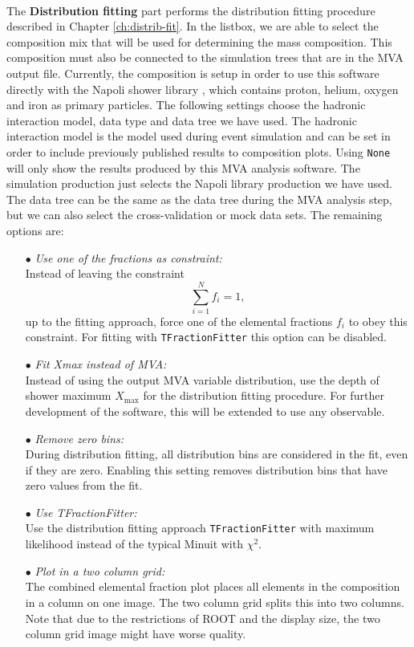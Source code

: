 \documentclass[12pt,a4paper]{report}
\begin{document}
\\
The \textbf{Distribution fitting} part performs the distribution fitting procedure described in Chapter \ref{ch:distrib-fit}. In the listbox, we are able to select the composition mix that will be used for determining the mass composition. This composition must also be connected to the simulation trees that are in the MVA output file. Currently, the composition is setup in order to use this software directly with the Napoli shower library \cite{napoli}, which contains proton, helium, oxygen and iron as primary particles. The following settings choose the hadronic interaction model, data type and data tree we have used. The hadronic interaction model is the model used during event simulation and can be set in order to include previously published results \cite{xmaxICRC2017,xmaxDistFitPRD2014,deltaMethod} to composition plots. Using \texttt{None} will only show the results produced by this MVA analysis software. The simulation production just selects the Napoli library production we have used. The data tree can be the same as the data tree during the MVA analysis step, but we can also select the cross-validation or mock data sets. The remaining options are:
\begin{itemize}
\item[$\bullet$] \emph{Use one of the fractions as constraint:}\\Instead of leaving the constraint
$$
\displaystyle\sum_{i=1}^{N} f_i = 1,
$$
up to the fitting approach, force one of the elemental fractions $f_i$ to obey this constraint. For fitting with \texttt{TFractionFitter} this option can be disabled.
\item[$\bullet$] \emph{Fit Xmax instead of MVA:}\\Instead of using the output MVA variable distribution, use the depth of shower maximum $X_{\textrm{max}}$ for the distribution fitting procedure. For further development of the software, this will be extended to use any observable.
\item[$\bullet$] \emph{Remove zero bins:}\\During distribution fitting, all distribution bins are considered in the fit, even if they are zero. Enabling this setting removes distribution bins that have zero values from the fit.
\item[$\bullet$] \emph{Use TFractionFitter:}\\Use the distribution fitting approach \texttt{TFractionFitter} \cite{tfractionfitter} with maximum likelihood instead of the typical Minuit with $\chi^2$.
\item[$\bullet$] \emph{Plot in a two column grid:}\\The combined elemental fraction plot places all elements in the composition in a column on one image. The two column grid splits this into two columns. Note that due to the restrictions of ROOT and the display size, the two column grid image might have worse quality.
\end{itemize}
\end{document}
